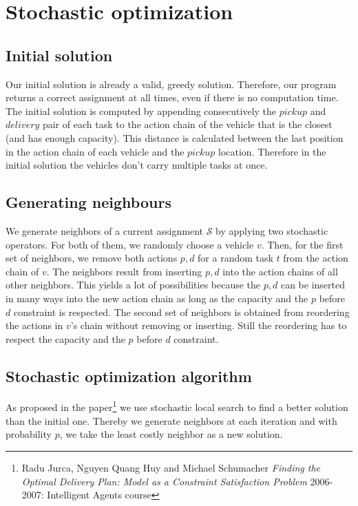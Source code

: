 \documentclass[11pt]{article}
\begin{document}
 \section{Stochastic optimization}

 \subsection{Initial solution}

 Our initial solution is already a valid, greedy solution. Therefore, our program
 returns a correct assignment at all times, even if there is no computation time.
 The initial solution is computed by appending consecutively the $pickup$ and
 $delivery$ pair of each task to the action chain of the vehicle that is the
 closest (and has enough capacity). This distance is calculated between the last
 position in the action chain of each vehicle and the $pickup$ location.
 Therefore in the initial solution the vehicles don't carry multiple tasks at
 once.


 \subsection{Generating neighbours}

 We generate neighbors of a current assignment $\mathcal{S}$ by applying two
 stochastic operators. For both of them, we randomly choose a vehicle $v$. Then,
 for the first set of neighbors, we remove both actions $p, d$ for a random task
 $t$ from the action chain of $v$. The neighbors result from inserting $p, d$
 into the action chains of all other neighbors. This yields a lot of
 possibilities because the $p, d$ can be inserted in many ways into the new
 action chain as long as the capacity and the $p$ before $d$ constraint is
 respected. The second set of neighbors is obtained from reordering the actions
 in $v$'s chain without removing or inserting. Still the reordering has to
 respect the capacity and the $p$ before $d$ constraint.


 \subsection{Stochastic optimization algorithm}

 As proposed in the paper\footnote{Radu Jurca, Nguyen Quang Huy and Michael
 Schumacher {\em Finding the Optimal Delivery Plan: Model as a Constraint
 Satisfaction Problem} 2006-2007: Intelligent Agents course} we use stochastic
 local search to find a better solution than the initial one. Thereby we generate
 neighbors at each iteration and with probability $p$, we take the least costly
 neighbor as a new solution.
\end{document}
